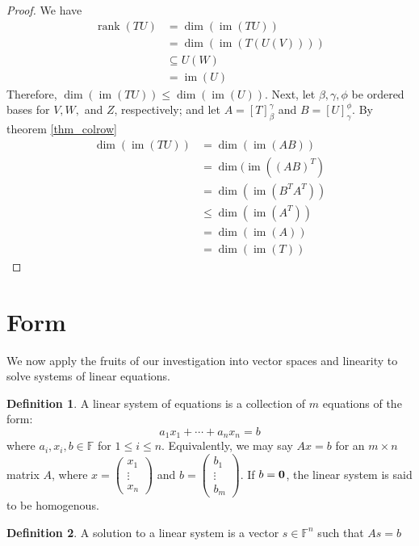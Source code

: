 \documentclass[oneside, 12pt]{book}
\DeclareMathOperator{\rank}{rank}
\DeclareMathOperator{\im}{im}
\theoremstyle{definition}
\newtheorem{defn}{Definition}[section]
\begin{document}
\begin{proof}
  We have
  \begin{align}
    \rank(TU)&=\dim(\im(TU)) \\
            &= \dim(\im(T(U(V)))) \\
            &\subseteq U(W) \\
            &= \im(U)
  \end{align}
  Therefore, $\dim(\im(TU))\leq \dim(\im(U))$. Next, let $\beta, \gamma, \phi$ be ordered bases for $V, W, $ and $Z$, respectively; and let
  $A=[T]_{\beta}^{\gamma}$ and $B=[U]_{\gamma}^{\phi}$.
  By theorem \ref{thm_colrow}
  \begin{align}
    \dim(\im(TU))&=\dim(\im(AB)) \\
                 &= \dim(\im((AB)^{T}) \\
                 &= \dim(\im(B^{T}A^{T})) \\
                 &\leq \dim(\im(A^{T})) \\
                 &= \dim(\im(A)) \\
    &= \dim(\im(T))
  \end{align}
\end{proof}
\section{Form}
We now apply the fruits of our investigation into vector spaces and linearity to solve systems of linear equations.
\begin{defn}
\label{def_linsys}
  A linear system of equations is a collection of $m$ equations of the form:
  \[ a_{1}x_{1}+ \cdots +a_{n}x_{n}=b \] where $a_{i}, x_{i},b \in \mathbb{F}$ for $1 \leq i \leq n$.
  Equivalently, we may say
  $Ax=b$ for an $m \times n$ matrix $A$, where $x= \begin{pmatrix} x_{1} \\ \vdots \\ x_{n}\end{pmatrix}$ and $b= \begin{pmatrix} b_{1} \\ \vdots \\ b_{m}\end{pmatrix}$.
  If $b=\bold{0}$, the linear system is said to be homogenous.
\end{defn}
\begin{defn}
\label{def_soln}
A solution to a linear system is a vector $s \in \mathbb{F}^{n}$ such that $As=b$
\end{defn}
\end{document}
